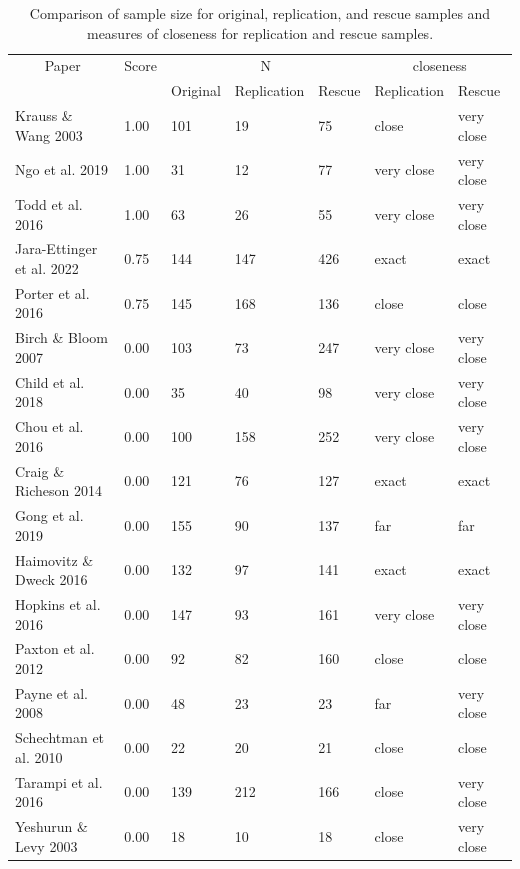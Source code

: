 \documentclass[
  english,
  a4paper,
]{article}
\begin{document}
\begin{table}

\caption{\label{tab:tab-size}Comparison of sample size for original, replication, and rescue samples and measures of closeness for replication and rescue samples.}
\centering
\begin{tabular}[t]{lllllll}
\toprule
\multicolumn{1}{c}{Paper} & \multicolumn{1}{c}{Score} & \multicolumn{3}{c}{N} & \multicolumn{2}{c}{closeness} \\
\cmidrule(l{3pt}r{3pt}){1-1} \cmidrule(l{3pt}r{3pt}){2-2} \cmidrule(l{3pt}r{3pt}){3-5} \cmidrule(l{3pt}r{3pt}){6-7}
 &  & Original & Replication & Rescue & Replication & Rescue\\
\midrule
Krauss \& Wang 2003 & 1.00 & 101 & 19 & 75 & close & very close\\
Ngo et al. 2019 & 1.00 & 31 & 12 & 77 & very close & very close\\
Todd et al. 2016 & 1.00 & 63 & 26 & 55 & very close & very close\\
Jara-Ettinger et al. 2022 & 0.75 & 144 & 147 & 426 & exact & exact\\
Porter et al. 2016 & 0.75 & 145 & 168 & 136 & close & close\\
Birch \& Bloom 2007 & 0.00 & 103 & 73 & 247 & very close & very close\\
Child et al. 2018 & 0.00 & 35 & 40 & 98 & very close & very close\\
Chou et al. 2016 & 0.00 & 100 & 158 & 252 & very close & very close\\
Craig \& Richeson 2014 & 0.00 & 121 & 76 & 127 & exact & exact\\
Gong et al. 2019 & 0.00 & 155 & 90 & 137 & far & far\\
Haimovitz \& Dweck 2016 & 0.00 & 132 & 97 & 141 & exact & exact\\
Hopkins et al. 2016 & 0.00 & 147 & 93 & 161 & very close & very close\\
Paxton et al. 2012 & 0.00 & 92 & 82 & 160 & close & close\\
Payne et al. 2008 & 0.00 & 48 & 23 & 23 & far & very close\\
Schechtman et al. 2010 & 0.00 & 22 & 20 & 21 & close & close\\
Tarampi et al. 2016 & 0.00 & 139 & 212 & 166 & close & very close\\
Yeshurun \& Levy 2003 & 0.00 & 18 & 10 & 18 & close & very close\\
\bottomrule
\end{tabular}
\end{table}
\end{document}
